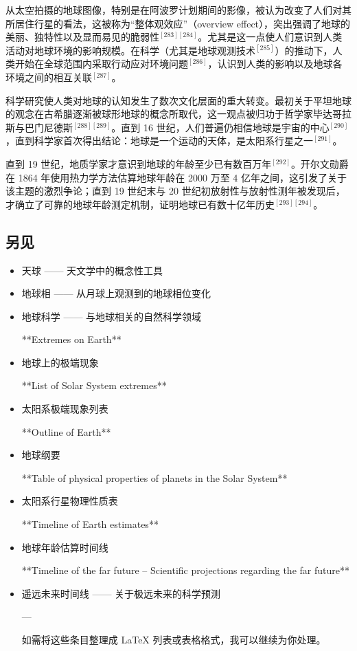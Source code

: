 从太空拍摄的地球图像，特别是在阿波罗计划期间的影像，被认为改变了人们对其所居住行星的看法，这被称为“整体观效应”（overview effect），突出强调了地球的美丽、独特性以及显而易见的脆弱性$^{[283][284]}$。尤其是这一点使人们意识到人类活动对地球环境的影响规模。在科学（尤其是地球观测技术$^{[285]}$）的推动下，人类开始在全球范围内采取行动应对环境问题$^{[286]}$，认识到人类的影响以及地球各环境之间的相互关联$^{[287]}$。

科学研究使人类对地球的认知发生了数次文化层面的重大转变。最初关于平坦地球的观念在古希腊逐渐被球形地球的概念所取代，这一观点被归功于哲学家毕达哥拉斯与巴门尼德斯$^{[288][289]}$。直到 16 世纪，人们普遍仍相信地球是宇宙的中心$^{[290]}$，直到科学家首次得出结论：地球是一个运动的天体，是太阳系行星之一$^{[291]}$。

直到 19 世纪，地质学家才意识到地球的年龄至少已有数百万年$^{[292]}$。开尔文勋爵在 1864 年使用热力学方法估算地球年龄在 2000 万至 4 亿年之间，这引发了关于该主题的激烈争论；直到 19 世纪末与 20 世纪初放射性与放射性测年被发现后，才确立了可靠的地球年龄测定机制，证明地球已有数十亿年历史$^{[293][294]}$。
\subsection{另见}
\begin{itemize}
\item 天球 —— 天文学中的概念性工具
\item 地球相 —— 从月球上观测到的地球相位变化
\item 地球科学 —— 与地球相关的自然科学领域

**Extremes on Earth**
\item 地球上的极端现象

**List of Solar System extremes**
\item 太阳系极端现象列表

**Outline of Earth**
\item 地球纲要

**Table of physical properties of planets in the Solar System**
\item 太阳系行星物理性质表

**Timeline of Earth estimates**
\item 地球年龄估算时间线

**Timeline of the far future – Scientific projections regarding the far future**
\item 遥远未来时间线 —— 关于极远未来的科学预测

---

如需将这些条目整理成 LaTeX 列表或表格格式，我可以继续为你处理。

\end{itemize}
